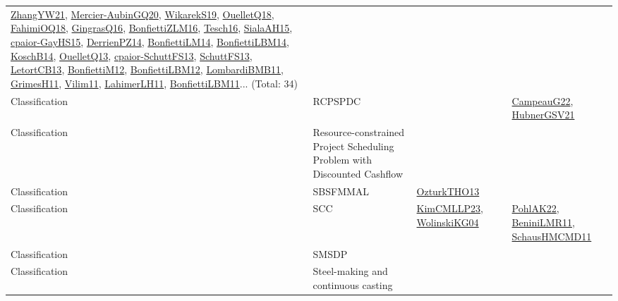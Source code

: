 {\begin{longtable}{lp{3cm}>{\raggedright}p{6cm}>{\raggedright}p{6cm}p{8cm}}
\href{articles/ZhangYW21.pdf}{ZhangYW21}\cite{ZhangYW21}, \href{papers/Mercier-AubinGQ20.pdf}{Mercier-AubinGQ20}\cite{Mercier-AubinGQ20}, \href{articles/WikarekS19.pdf}{WikarekS19}\cite{WikarekS19}, \href{papers/OuelletQ18.pdf}{OuelletQ18}\cite{OuelletQ18}, \href{articles/FahimiOQ18.pdf}{FahimiOQ18}\cite{FahimiOQ18}, \href{papers/GingrasQ16.pdf}{GingrasQ16}\cite{GingrasQ16}, \href{papers/BonfiettiZLM16.pdf}{BonfiettiZLM16}\cite{BonfiettiZLM16}, \href{papers/Tesch16.pdf}{Tesch16}\cite{Tesch16}, \href{papers/SialaAH15.pdf}{SialaAH15}\cite{SialaAH15}, \href{papers/cpaior-GayHS15.pdf}{cpaior-GayHS15}\cite{cpaior-GayHS15}, \href{papers/DerrienPZ14.pdf}{DerrienPZ14}\cite{DerrienPZ14}, \href{papers/BonfiettiLM14.pdf}{BonfiettiLM14}\cite{BonfiettiLM14}, \href{articles/BonfiettiLBM14.pdf}{BonfiettiLBM14}\cite{BonfiettiLBM14}, \href{papers/KoschB14.pdf}{KoschB14}\cite{KoschB14}, \href{papers/OuelletQ13.pdf}{OuelletQ13}\cite{OuelletQ13}, \href{papers/cpaior-SchuttFS13.pdf}{cpaior-SchuttFS13}\cite{cpaior-SchuttFS13}, \href{papers/SchuttFS13.pdf}{SchuttFS13}\cite{SchuttFS13}, \href{papers/LetortCB13.pdf}{LetortCB13}\cite{LetortCB13}, \href{papers/BonfiettiM12.pdf}{BonfiettiM12}\cite{BonfiettiM12}, \href{papers/BonfiettiLBM12.pdf}{BonfiettiLBM12}\cite{BonfiettiLBM12}, \href{papers/LombardiBMB11.pdf}{LombardiBMB11}\cite{LombardiBMB11}, \href{papers/GrimesH11.pdf}{GrimesH11}\cite{GrimesH11}, \href{papers/Vilim11.pdf}{Vilim11}\cite{Vilim11}, \href{papers/LahimerLH11.pdf}{LahimerLH11}\cite{LahimerLH11}, \href{papers/BonfiettiLBM11.pdf}{BonfiettiLBM11}\cite{BonfiettiLBM11}... (Total: 34)\\
Classification & RCPSPDC &  &  & \href{articles/CampeauG22.pdf}{CampeauG22}\cite{CampeauG22}, \href{articles/HubnerGSV21.pdf}{HubnerGSV21}\cite{HubnerGSV21}\\
Classification & Resource-constrained Project Scheduling Problem with Discounted Cashflow &  &  & \\
Classification & SBSFMMAL & \href{articles/OzturkTHO13.pdf}{OzturkTHO13}\cite{OzturkTHO13} &  & \\
Classification & SCC & \href{papers/KimCMLLP23.pdf}{KimCMLLP23}\cite{KimCMLLP23}, \href{papers/WolinskiKG04.pdf}{WolinskiKG04}\cite{WolinskiKG04} &  & \href{articles/PohlAK22.pdf}{PohlAK22}\cite{PohlAK22}, \href{articles/BeniniLMR11.pdf}{BeniniLMR11}\cite{BeniniLMR11}, \href{articles/SchausHMCMD11.pdf}{SchausHMCMD11}\cite{SchausHMCMD11}\\
Classification & SMSDP &  &  & \\
Classification & Steel-making and continuous casting &  &  & \\

\end{longtable}}
